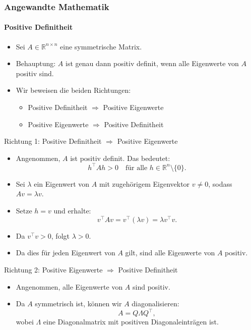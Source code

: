 \documentclass{beamer}
\begin{document}
 
 \begin{frame}
    \frametitle{Angewandte Mathematik}
    \framesubtitle{Positive Definitheit}
     \begin{itemize}
         \item Sei \( A \in \mathbb{R}^{n \times n} \) eine symmetrische Matrix.
         \item Behauptung: \( A \) ist genau dann positiv definit, wenn alle Eigenwerte von \( A \) positiv sind.
         \item Wir beweisen die beiden Richtungen:
         \begin{itemize}
             \item Positive Definitheit \( \Rightarrow \) Positive Eigenwerte
             \item Positive Eigenwerte \( \Rightarrow \) Positive Definitheit
         \end{itemize}
     \end{itemize}
 \end{frame}
 
 \begin{frame}{Richtung 1: Positive Definitheit \( \Rightarrow \) Positive Eigenwerte}
     \begin{itemize}
         \item Angenommen, \( A \) ist positiv definit. Das bedeutet:
         \[
         h^\top A h > 0 \quad \text{für alle } h \in \mathbb{R}^n \setminus \{0\}.
         \]
         \item Sei \( \lambda \) ein Eigenwert von \( A \) mit zugehörigem Eigenvektor \( v \neq 0 \), sodass \( A v = \lambda v \).
         \item Setze \( h = v \) und erhalte:
         \[
         v^\top A v = v^\top (\lambda v) = \lambda v^\top v.
         \]
         \item Da \( v^\top v > 0 \), folgt \( \lambda > 0 \).
   
         \item Da dies für jeden Eigenwert von \( A \) gilt, sind alle Eigenwerte von \( A \) positiv.
     \end{itemize}
 \end{frame}
 
 \begin{frame}{Richtung 2: Positive Eigenwerte \( \Rightarrow \) Positive Definitheit}
     \begin{itemize}
         \item Angenommen, alle Eigenwerte von \( A \) sind positiv.
         \item Da \( A \) symmetrisch ist, können wir \( A \) diagonalisieren:
         \[
         A = Q \Lambda Q^\top,
         \]
         wobei \( \Lambda \) eine Diagonalmatrix mit positiven Diagonaleinträgen ist.
     \end{itemize}
 \end{frame}
 
\end{document}
